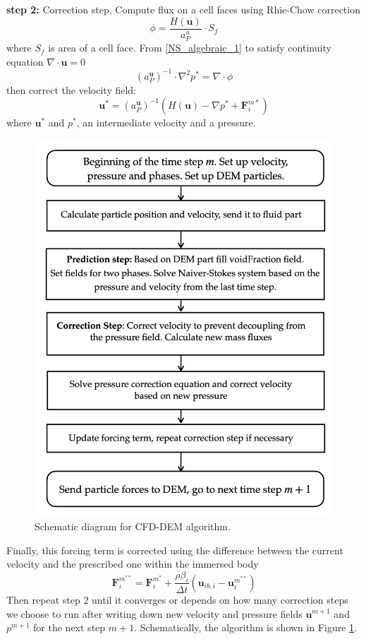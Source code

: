 \textbf{step 2:} Correction step,
Compute flux on a cell faces using Rhie-Chow \cite{rhie} correction
\begin{equation}
    \phi = \frac{H(\mathbf{u})}{a^u_P}\cdot S_f
\end{equation}
where $S_f$ is area of a cell face.
From \ref{NS_algebraic_1} to satisfy continuity equation $\nabla\cdot \mathbf{u} = 0$
\begin{equation}
    (a_{P}^{\mathbf{u}})^{-1} \cdot \nabla^2 p^* = \nabla \cdot \phi
\end{equation}
then correct the velocity field:
\begin{equation}
    \mathbf{u}^{*} = (a_{P}^{\mathbf{u}})^{-1}(H(\mathbf{u}) - \nabla p^* + \mathbf{F}^{m*}_i)
\end{equation}
where $\mathbf{u}^*$ and $p^*$, an intermediate velocity and a pressure. 

\begin{figure}[H]
    \centering
    \includegraphics[width=12cm]{Images/chap3/diag_PISO.png}
    \caption{Schematic diagram for CFD-DEM algorithm.}
    \label{fig:diag_PISO}
\end{figure}

Finally, this forcing term is corrected using the difference between the current velocity and the prescribed one within the immersed body
\begin{equation}
\mathbf{F}_{i}^{m^{* *}} = \boldsymbol{F}_{i}^{m^{*}}+\frac{\rho \beta_{i}}{\Delta t}\left(\boldsymbol{u}_{i b, i}-\boldsymbol{u}_{i}^{m^{* *}}\right)
\end{equation}
Then repeat step 2 until it converges or depends on how many correction steps we choose to run after writing down new velocity and pressure fields $\mathbf{u}^{m+1}$ and $p^{m+1}$ for the next step $m + 1$. Schematically, the algorithm is shown in Figure \ref{fig:diag_PISO}.



